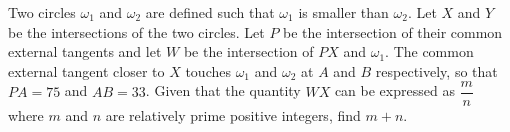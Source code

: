 Two circles $\omega_1$ and $\omega_2$ are defined such that $\omega_1$ is smaller than $\omega_2$. Let $X$ and $Y$ be the intersections of the two circles. Let $P$ be the intersection of their common external tangents and let $W$ be the intersection of $PX$ and $\omega_1$. The common external tangent closer to $X$ touches $\omega_1$ and $\omega_2$ at $A$ and $B$ respectively, so that $PA=75$ and $AB=33$. Given that the quantity $WX$ can be expressed as $\dfrac{m}{n}$ where $m$ and $n$ are relatively prime positive integers, find $m+n$.
